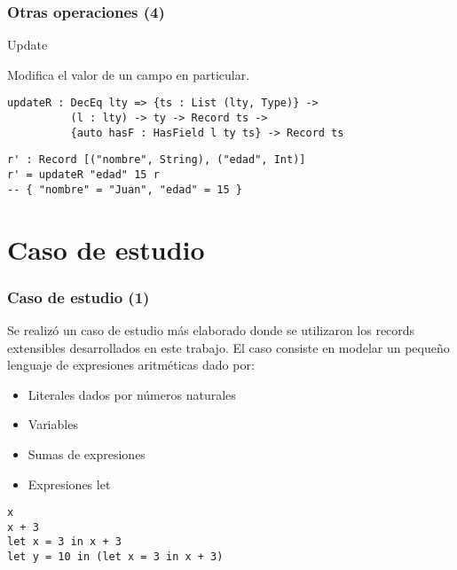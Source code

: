 \documentclass{beamer}
\begin{document}
\begin{frame}[fragile]
\frametitle{Otras operaciones (4)}

\begin{block}{Update}

Modifica el valor de un campo en particular.

\begin{definition}
\begin{verbatim}
updateR : DecEq lty => {ts : List (lty, Type)} -> 
          (l : lty) -> ty -> Record ts -> 
          {auto hasF : HasField l ty ts} -> Record ts
\end{verbatim}
\end{definition}

\begin{example}
\begin{verbatim}
r' : Record [("nombre", String), ("edad", Int)]
r' = updateR "edad" 15 r
-- { "nombre" = "Juan", "edad" = 15 }
\end{verbatim}
\end{example}

\end{block}

\end{frame}

\section{Caso de estudio}

\begin{frame}[fragile]
\frametitle{Caso de estudio (1)}

Se realizó un caso de estudio más elaborado donde se utilizaron los records extensibles desarrollados en este trabajo. El caso consiste en modelar un pequeño lenguaje de expresiones aritméticas dado por:

\begin{itemize}
\item Literales dados por números naturales
\item Variables
\item Sumas de expresiones
\item Expresiones let
\end{itemize}

\begin{example}
\begin{verbatim}
x
x + 3
let x = 3 in x + 3
let y = 10 in (let x = 3 in x + 3)
\end{verbatim}
\end{example}
\end{frame}
\end{document}
